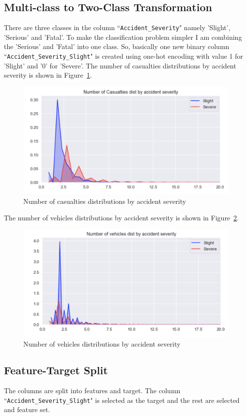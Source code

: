 \documentclass[12pt]{article}
\begin{document}
\clearpage
\subsection{Multi-class to Two-Class Transformation}
There are three classes in the column ``\verb|Accident_Severity|" namely 'Slight', 'Serious' and 'Fatal'. To make the classification problem simpler I am combining the  'Serious' and 'Fatal' into one class. So, basically one new binary column ``\verb|Accident_Severity_Slight|" is created using one-hot encoding with value 1 for 'Slight' and '0' for 'Severe'.
The number of casualties distributions by accident severity is shown in Figure~\ref{fig10}. 
\begin{figure}[h!]
\centering
\includegraphics[width=0.8\linewidth]{"./figs/fig10"}
\caption{Number of casualties distributions by accident severity}
\label{fig10}
\end{figure}
The number of vehicles distributions by accident severity is shown in Figure~\ref{fig11}. 
\begin{figure}[h!]
\centering
\includegraphics[width=0.8\linewidth]{"./figs/fig11"}
\caption{Number of vehicles distributions by accident severity}
\label{fig11}
\end{figure}
\subsection{Feature-Target Split}
The columns are split into features and target. The column ``\verb|Accident_Severity_Slight|" is selected as the target and the rest are selected and feature set.
\end{document}
